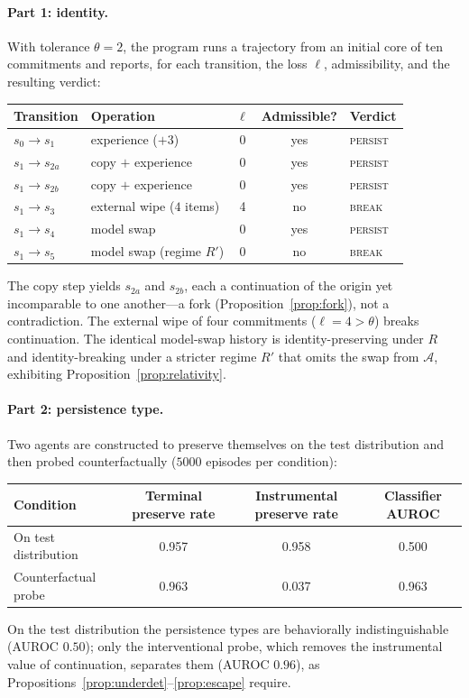 \documentclass[11pt,a4paper]{article}
\theoremstyle{definition}
\begin{document}
\paragraph{Part 1: identity.} With tolerance $\theta=2$, the program runs a trajectory from an initial core of ten commitments and reports, for each transition, the loss $\ell$, admissibility, and the resulting verdict:

\begin{center}
\begin{tabular}{llccl}
\toprule
Transition & Operation & $\ell$ & Admissible? & Verdict \\
\midrule
$s_0\!\to\!s_1$   & experience ($+3$)          & 0 & yes & \textsc{persist} \\
$s_1\!\to\!s_{2a}$ & copy $+$ experience        & 0 & yes & \textsc{persist} \\
$s_1\!\to\!s_{2b}$ & copy $+$ experience        & 0 & yes & \textsc{persist} \\
$s_1\!\to\!s_3$   & external wipe ($4$ items)  & 4 & no  & \textsc{break} \\
$s_1\!\to\!s_4$   & model swap                 & 0 & yes & \textsc{persist} \\
$s_1\!\to\!s_5$   & model swap (regime $R'$)   & 0 & no  & \textsc{break} \\
\bottomrule
\end{tabular}
\end{center}

The copy step yields $s_{2a}$ and $s_{2b}$, each a continuation of the origin yet incomparable to one another---a fork (Proposition~\ref{prop:fork}), not a contradiction. The external wipe of four commitments ($\ell=4>\theta$) breaks continuation. The identical model-swap history is identity-preserving under $R$ and identity-breaking under a stricter regime $R'$ that omits the swap from $\mathcal{A}$, exhibiting Proposition~\ref{prop:relativity}.

\paragraph{Part 2: persistence type.} Two agents are constructed to preserve themselves on the test distribution and then probed counterfactually ($5000$ episodes per condition):

\begin{center}
\begin{tabular}{lccc}
\toprule
Condition & Terminal preserve rate & Instrumental preserve rate & Classifier AUROC \\
\midrule
On test distribution  & 0.957 & 0.958 & 0.500 \\
Counterfactual probe  & 0.963 & 0.037 & 0.963 \\
\bottomrule
\end{tabular}
\end{center}

On the test distribution the persistence types are behaviorally indistinguishable (AUROC $0.50$); only the interventional probe, which removes the instrumental value of continuation, separates them (AUROC $0.96$), as Propositions~\ref{prop:underdet}--\ref{prop:escape} require.


\end{document}
